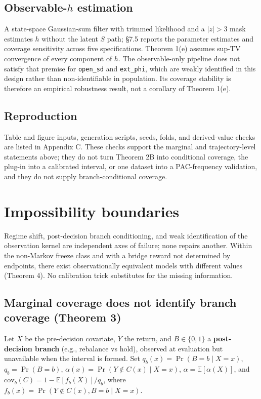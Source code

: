 \subsection{Observable-$h$ estimation}

A state-space Gaussian-sum filter with trimmed likelihood and a $|z|>3$ mask estimates $h$ without the latent $S$ path; \S7.5 reports the parameter estimates and coverage sensitivity across five specifications. Theorem 1(e) assumes sup-TV convergence of every component of $h$. The observable-only pipeline does not satisfy that premise for \texttt{open\_sd} and \texttt{ext\_phi}, which are weakly identified in this design rather than non-identifiable in population. Its coverage stability is therefore an empirical robustness result, not a corollary of Theorem 1(e).

\subsection{Reproduction}

Table and figure inputs, generation scripts, seeds, folds, and derived-value checks are listed in Appendix C. These checks support the marginal and trajectory-level statements above; they do not turn Theorem 2B into conditional coverage, the plug-in into a calibrated interval, or one dataset into a PAC-frequency validation, and they do not supply branch-conditional coverage.

\section{Impossibility boundaries}

Regime shift, post-decision branch conditioning, and weak identification of the observation kernel are independent axes of failure; none repairs another. Within the non-Markov freeze class and with a bridge reward not determined by endpoints, there exist observationally equivalent models with different values (Theorem 4). No calibration trick substitutes for the missing information.

\subsection{Marginal coverage does not identify branch coverage (Theorem 3)}

Let $X$ be the pre-decision covariate, $Y$ the return, and $B\in\{0,1\}$ a \textbf{post-decision branch} (e.g., rebalance vs hold), observed at evaluation but unavailable when the interval is formed. Set $q_b(x)=\Pr(B=b\mid X=x)$, $q_b=\Pr(B=b)$, $\alpha(x)=\Pr(Y\notin C(x)\mid X=x)$, $\alpha=\mathbb E[\alpha(X)]$, and $\mathrm{cov}_b(C)=1-\mathbb E[f_b(X)]/q_b$, where $f_b(x)=\Pr(Y\notin C(x),B=b\mid X=x)$.

